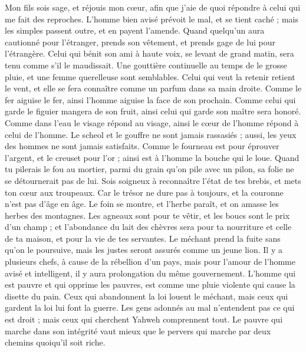 \begin{multicols}{2}
Mon fils sois sage, et réjouis mon cœur, afin que j'aie de quoi répondre à celui qui me fait des reproches.
L'homme bien avisé prévoit le mal, et se tient caché ; mais les simples passent outre, et en payent l'amende.
Quand quelqu'un aura cautionné pour l'étranger, prends son vêtement, et prends gage de lui pour l'étrangère.
Celui qui bénit son ami à haute voix, se levant de grand matin, sera tenu comme s'il le maudissait.
Une gouttière continuelle au temps de le grosse pluie, et une femme querelleuse sont semblables.
Celui qui veut la retenir retient le vent, et elle se fera connaître comme un parfum dans sa main droite. 
Comme le fer aiguise le fer, ainsi l'homme aiguise la face de son prochain.
Comme celui qui garde le figuier mangera de son fruit, ainsi celui qui garde son maître sera honoré.
Comme dans l'eau le visage répond au visage, ainsi le cœur de l'homme répond à celui de l'homme.
Le scheol et le gouffre ne sont jamais rassasiés ; aussi, les yeux des hommes ne sont jamais satisfaits.
Comme le fourneau est pour éprouver l'argent, et le creuset pour l'or ; ainsi est à l'homme la bouche qui le loue.
Quand tu pilerais le fou au mortier, parmi du grain qu'on pile avec un pilon, sa folie ne se détournerait pas de lui.
Sois soigneux à reconnaître l'état de tes brebis, et mets ton cœur aux troupeaux.
Car le trésor ne dure pas à toujours, et la couronne n'est pas d'âge en âge.
Le foin se montre, et l'herbe paraît, et on amasse les herbes des montagnes.
Les agneaux sont pour te vêtir, et les boucs sont le prix d'un champ ;
et l'abondance du lait des chèvres sera pour ta nourriture et celle de ta maison, et pour la vie de tes servantes.
\VerseOne{}Le méchant prend la fuite sans qu'on le poursuive, mais les justes seront assurés comme un jeune lion.
Il y a plusieurs chefs, à cause de la rébellion d'un pays, mais pour l'amour de l'homme avisé et intelligent, il y aura prolongation du même gouvernement.
L'homme qui est pauvre et qui opprime les pauvres, est comme une pluie violente qui cause la disette du pain.
Ceux qui abandonnent la loi louent le méchant, mais ceux qui gardent la loi lui font la guerre.
Les gens adonnés au mal n'entendent pas ce qui est droit ; mais ceux qui cherchent Yahweh comprennent tout.
Le pauvre qui marche dans son intégrité vaut mieux que le pervers qui marche par deux chemins quoiqu'il soit riche.

\end{multicols}
